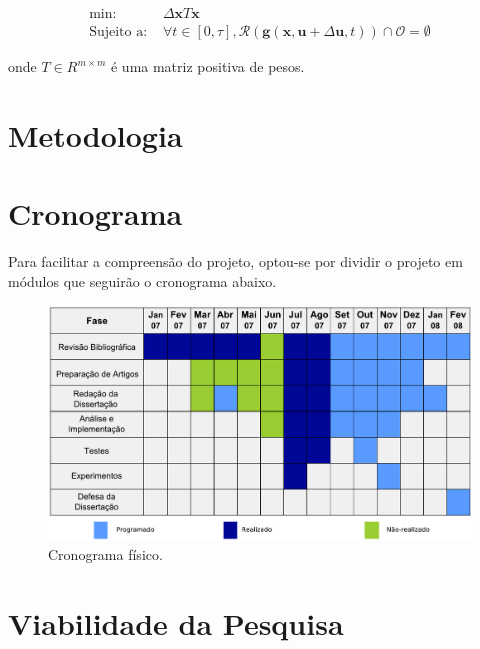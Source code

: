 \documentclass[a4paper, 12pt]{article}
\begin{document}
\begin{equation}
\begin{aligned}
\text{min: }& \Delta\mathbf{x}T\mathbf{x} \\
\text{Sujeito a: }& \forall t \in [0,\tau], \mathcal{R}(\mathbf{g}(\mathbf{x}, \mathbf{u}+\Delta\mathbf{u}, t)) \cap \mathcal{O} = \emptyset
\end{aligned}
\label{eq:equacaoProb}
\end{equation}


\noindent onde $T \in R^{m \times m}$ é uma matriz positiva de pesos.

\newpage

\section{Metodologia}
\label{sec:meto}

\newpage

\section{Cronograma} 
\label{sec:crono}
Para facilitar a compreensão do projeto, optou-se por dividir o projeto em módulos que seguirão o cronograma abaixo.
\begin{figure}[h]
	\centering
		\includegraphics[scale=0.4]{img/cronograma.pdf}
	\caption{Cronograma físico.}
	\label{fig:cronograma}
\end{figure}

\newpage

\section{Viabilidade da Pesquisa}
\label{sec:viabilidade}

\newpage
\end{document}
